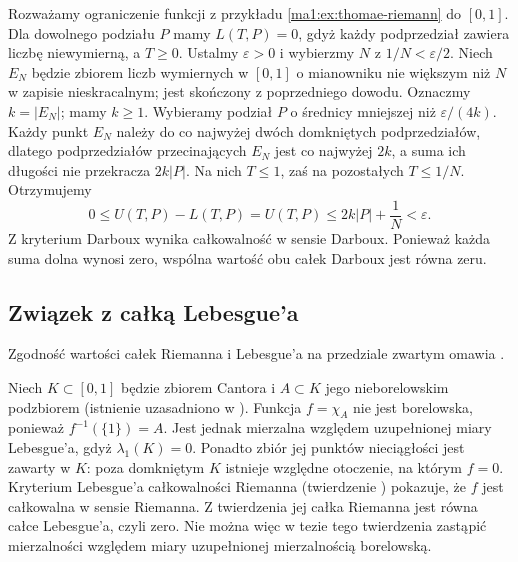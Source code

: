 \begin{przyklad}
Rozważamy ograniczenie funkcji z przykładu \ref{ma1:ex:thomae-riemann} do $[0,1]$.
Dla dowolnego podziału $P$ mamy $L(T,P)=0$, gdyż każdy podprzedział zawiera liczbę niewymierną, a $T\ge0$. Ustalmy $\varepsilon>0$ i wybierzmy $N$ z $1/N<\varepsilon/2$. Niech $E_N$ będzie zbiorem liczb wymiernych w $[0,1]$ o mianowniku nie większym niż $N$ w zapisie nieskracalnym; jest skończony z poprzedniego dowodu. Oznaczmy $k=|E_N|$; mamy $k\ge1$. Wybieramy podział $P$ o średnicy mniejszej niż $\varepsilon/(4k)$. Każdy punkt $E_N$ należy do co najwyżej dwóch domkniętych podprzedziałów, dlatego podprzedziałów przecinających $E_N$ jest co najwyżej $2k$, a suma ich długości nie przekracza $2k|P|$. Na nich $T\le1$, zaś na pozostałych $T\le1/N$. Otrzymujemy
\[
0\le U(T,P)-L(T,P)=U(T,P)
\le 2k|P|+\frac1N<\varepsilon.
\]
Z kryterium Darboux wynika całkowalność w sensie Darboux. Ponieważ każda suma dolna wynosi zero, wspólna wartość obu całek Darboux jest równa zeru.
\end{przyklad}

\subsection{Związek z całką Lebesgue'a}
Zgodność wartości całek Riemanna i Lebesgue'a na przedziale zwartym omawia .

\begin{przyklad}
\label{it:ex:riemann-nonborel}
Niech $K\subset[0,1]$ będzie zbiorem Cantora i
$A\subset K$ jego nieborelowskim podzbiorem
(istnienie uzasadniono w
).
Funkcja $f=\chi_A$ nie jest borelowska, ponieważ
$f^{-1}(\{1\})=A$. Jest jednak mierzalna względem
uzupełnionej miary Lebesgue'a, gdyż
$\lambda_1(K)=0$. Ponadto zbiór jej punktów
nieciągłości jest zawarty w $K$: poza domkniętym
$K$ istnieje względne otoczenie, na którym $f=0$.
Kryterium Lebesgue'a całkowalności Riemanna
(twierdzenie )
pokazuje, że $f$ jest całkowalna w sensie Riemanna.
Z twierdzenia  jej całka
Riemanna jest równa całce Lebesgue'a, czyli zero.
Nie można więc w tezie tego twierdzenia
zastąpić mierzalności względem miary uzupełnionej
mierzalnością borelowską.
\end{przyklad}

